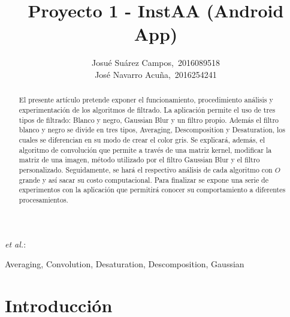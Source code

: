 \documentclass[journal]{IEEEtran}
\begin{document}
\title{Proyecto 1 - InstAA (Android App)}


\author{Josué Suárez Campos,~2016089518\\
       José Navarro Acuña,~2016254241 }
 
{\MakeLowercase{\textit{et al.}}:}

\maketitle


\begin{abstract}
El presente artículo pretende exponer el funcionamiento, procedimiento análisis y experimentación de los algoritmos de filtrado. La aplicación permite el uso de tres tipos de filtrado: Blanco y negro, Gaussian Blur y un filtro propio. Además el filtro blanco y negro se divide en tres tipos, Averaging, Descomposition y Desaturation, los cuales se diferencian en su modo de crear el color gris. Se explicará, además, el algoritmo de convolución que permite a través de una matriz kernel, modificar la matriz de una imagen, método utilizado por el filtro Gaussian Blur y el filtro personalizado. Seguidamente, se hará el respectivo análisis de cada algoritmo con $O$ grande y así sacar su costo computacional. Para finalizar se expone una serie de experimentos con la aplicación que permitirá conocer su comportamiento a diferentes procesamientos.
\end{abstract}

\renewcommand{\IEEEkeywordsname}{Palabra clave}
\begin{IEEEkeywords}
Averaging, Convolution, Desaturation, Descomposition, Gaussian
\end{IEEEkeywords}



\IEEEpeerreviewmaketitle



\section{Introducción}
\end{document}
